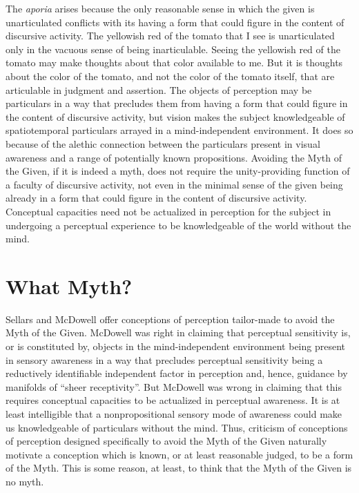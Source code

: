 \documentclass[12pt]{article}
\begin{document}
The \emph{aporia} arises because the only reasonable sense in which the given is unarticulated conflicts with its having a form that could figure in the content of discursive activity. The yellowish red of the tomato that I see is unarticulated only in the vacuous sense of being inarticulable. Seeing the yellowish red of the tomato may make thoughts about that color available to me. But it is thoughts about the color of the tomato, and not the color of the tomato itself, that are articulable in judgment and assertion. The objects of perception may be particulars in a way that precludes them from having a form that could figure in the content of discursive activity, but vision makes the subject knowledgeable of spatiotemporal particulars arrayed in a mind-independent environment. It does so because of the alethic connection between the particulars present in visual awareness and a range of potentially known propositions. Avoiding the Myth of the Given, if it is indeed a myth, does not require the unity-providing function of a faculty of discursive activity, not even in the minimal sense of the given being already in a form that could figure in the content of discursive activity. Conceptual capacities need not be actualized in perception for the subject in undergoing a perceptual experience to be knowledgeable of the world without the mind.



\section{What Myth?} %
\label{sec:what_myth_}

Sellars and McDowell offer conceptions of perception tailor-made to avoid the Myth of the Given. McDowell was right in claiming that perceptual sensitivity is, or is constituted by, objects in the mind-independent environment being present in sensory awareness in a way that precludes perceptual sensitivity being a reductively identifiable independent factor in perception and, hence, guidance by manifolds of “sheer receptivity”. But McDowell was wrong in claiming that this requires conceptual capacities to be actualized in perceptual awareness. It is at least intelligible that a nonpropositional sensory mode of awareness could make us knowledgeable of particulars without the mind. Thus, criticism of conceptions of perception designed specifically to avoid the Myth of the Given naturally motivate a conception which is known, or at least reasonable judged, to be a form of the Myth. This is some reason, at least, to think that the Myth of the Given is no myth. 
\end{document}
